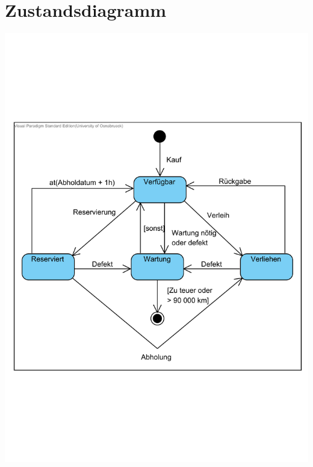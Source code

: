 \documentclass{scrartcl}
\begin{document}
\section{Zustandsdiagramm}
\includegraphics[width=\linewidth]{Autovermietung.pdf}
\end{document}
